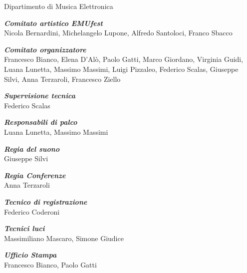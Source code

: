 \documentclass[9pt, twoside, a5paper]{extreport}
\begin{document}
{

\medskip

{\fontsize{12}{12}\selectfont \textsf{Dipartimento di Musica Elettronica}}\\

\vspace{.5cm}

\textbf{\textit{Comitato artistico EMUfest}}\\
Nicola Bernardini, Michelangelo Lupone, Alfredo Santoloci, Franco Sbacco

\medskip

\textbf{\textit{Comitato organizzatore}}\\
Francesco Bianco, Elena D'Alò, Paolo Gatti, Marco Giordano, Virginia Guidi, Luana Lunetta, Massimo Massimi, Luigi Pizzaleo, Federico Scalas, Giuseppe Silvi, Anna Terzaroli, Francesco Ziello  

\medskip

\textbf{\textit{Supervisione tecnica}}\\

Federico Scalas

\medskip

\textbf{\textit{Responsabili di palco}}\\

Luana Lunetta, Massimo Massimi

\medskip

\textbf{\textit{Regia del suono}}\\

Giuseppe Silvi

\medskip

\textbf{\textit{Regia Conferenze}}\\

Anna Terzaroli

\medskip

\textbf{\textit{Tecnico di registrazione}}\\

Federico Coderoni

\medskip

\textbf{\textit{Tecnici luci}}\\

Massimiliano Mascaro, Simone Giudice

\medskip

\textbf{\textit{Ufficio Stampa}}\\

Francesco Bianco, Paolo Gatti

}
\end{document}
